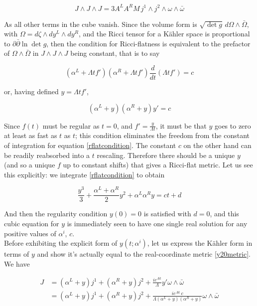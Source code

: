 \documentclass[11pt,a4paper,oneside,openright,titlepage]{book}
\begin{document}
\begin{equation}
	J \wedge J \wedge J = 3 A^L A^R M \, j^1 \wedge j^2 \wedge \omega \wedge \bar \omega
\end{equation}

As all other terms in the cube vanish. Since the volume form is $\sqrt{\det g} \, d\Omega \wedge \bar \Omega$, with $\Omega = d\zeta \wedge dy^L \wedge dy^R$, and the Ricci tensor for a K\"ahler space is proportional to $\partial \bar \partial \ln \det g$, then the condition for Ricci-flatness is equivalent to the prefactor of $\Omega \wedge \bar \Omega$ in $J\wedge J \wedge J$ being constant, that is to say

\begin{equation}
	(\alpha^L + \Lambda t f')(\alpha^R + \Lambda t f') \frac{d}{dt} (\Lambda t f') = c \label{rflatcondition}
\end{equation}

or, having defined $y = \Lambda t f'$,

\begin{equation}
	(\alpha^L + y)(\alpha^R + y) y' = c
\end{equation}

Since $f(t)$ must be regular as $t=0$, and $f' = \frac{y}{\Lambda t}$, it must be that $y$ goes to zero at least as fast as $t$ as $t$; this condition eliminates the freedom from the constant of integration for equation \ref{rflatcondition}. The constant $c$ on the other hand can be readily reabsorbed into a $t$ rescaling. Therefore there should be a unique $y$ (and so a unique $f$ up to constant shifts) that gives a Ricci-flat metric. Let us see this explicitly: we integrate \ref{rflatcondition} to obtain

\begin{equation}
	\frac{y^3}{3} + \frac{\alpha^L + \alpha^R}{2} y^2 + \alpha^L \alpha^R y = ct + d \label{rflatintegrated}
\end{equation}

And then the regularity condition $y(0)=0$ is satisfied with $d=0$, and this cubic equation for $y$ is immediately seen to have one single real solution for any positive values of $\alpha^i$, $c$.\\

Before exhibiting the explicit form of $y(t;\alpha^i)$, let us express the K\"ahler form in terms of $y$ and show it's actually equal to the real-coordinate metric \ref{y20metric}. We have

\begin{align}
	J & =  (\alpha^L + y) j^1 + (\alpha^R + y) j^2 + \frac{ie^{\Lambda k}}\Lambda y' \omega \wedge \bar \omega\\
	  & =  (\alpha^L + y) j^1 + (\alpha^R + y) j^2 + \frac{ie^{\Lambda k} \,c}{\Lambda (\alpha^L + y)(\alpha^R + y)} \omega \wedge \bar \omega
\end{align}
\end{document}
